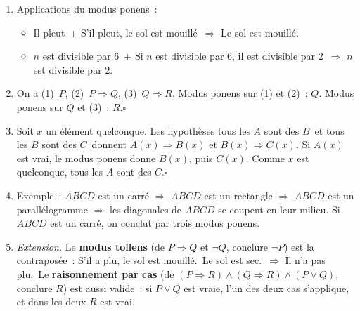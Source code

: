 \begin{enumerate}
  \item Applications du modus ponens~:
        \begin{itemize}
          \item \og Il pleut\fg\ + \og S'il pleut, le sol est mouill\'e\fg\ $\Rightarrow$
                \og Le sol est mouill\'e.\fg
          \item \og $n$ est divisible par $6$\fg\ + \og Si $n$ est divisible par $6$, il est
                divisible par $2$\fg\ $\Rightarrow$ \og $n$ est divisible par $2$.\fg
        \end{itemize}
  \item On a (1)~$P$, (2)~$P\Rightarrow Q$, (3)~$Q\Rightarrow R$.
        Modus ponens sur (1) et (2)~: $Q$. Modus ponens sur $Q$ et (3)~: $R$.\hfill$\square$
  \item Soit $x$ un \'el\'ement quelconque. Les hypoth\`eses \og tous les $A$ sont des $B$\fg\ et
        \og tous les $B$ sont des $C$\fg\ donnent $A(x)\Rightarrow B(x)$ et $B(x)\Rightarrow C(x)$.
        Si $A(x)$ est vrai, le modus ponens donne $B(x)$, puis $C(x)$.
        Comme $x$ est quelconque, tous les $A$ sont des $C$.\hfill$\square$
  \item Exemple~: $ABCD$ est un carr\'e $\Rightarrow$ $ABCD$ est un rectangle
        $\Rightarrow$ $ABCD$ est un parall\'elogramme $\Rightarrow$ les diagonales de $ABCD$
        se coupent en leur milieu. Si $ABCD$ est un carr\'e, on conclut par trois modus ponens.
  \item[] \textit{Extension.} Le \textbf{modus tollens} (de $P\Rightarrow Q$ et $\lnot Q$, conclure $\lnot P$)
        est la contrapos\'ee~: \og S'il a plu, le sol est mouill\'e.\fg\ \og Le sol est sec.\fg\
        $\Rightarrow$ \og Il n'a pas plu.\fg\ Le \textbf{raisonnement par cas}
        (de $(P\Rightarrow R)\land(Q\Rightarrow R)\land(P\lor Q)$, conclure $R$) est aussi valide~:
        si $P\lor Q$ est vraie, l'un des deux cas s'applique, et dans les deux $R$ est vrai.
\end{enumerate}




